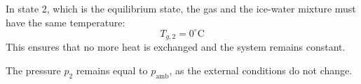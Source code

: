 In state 2, which is the equilibrium state, the gas and the ice-water mixture must have the same temperature:  
\[
T_{g,2} = 0^\circ \text{C}
\]  
This ensures that no more heat is exchanged and the system remains constant.  

The pressure \( p_2 \) remains equal to \( p_{\text{amb}} \), as the external conditions do not change.